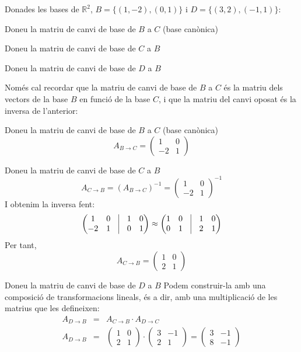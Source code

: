 \Exercise Donades les bases de $\mathbb{R}^2$, $B=\{(1,-2),(0,1)\}$ i $D=\{(3,2),(-1,1)\}$:
\begin{llista}[label=(\alph*)]
  \item Doneu la matriu de canvi de base de $B$ a $C$ (base canònica)
  \item Doneu la matriu de canvi de base de $C$ a $B$
  \item Doneu la matriu de canvi de base de $D$ a $B$
\end{llista}

\Answer Només cal recordar que la matriu de canvi de base de $B$ a $C$ és la matriu dels vectors de la base $B$ en funció de la base $C$, i que la matriu del canvi oposat és la inversa de l'anterior:
\begin{llista}[label=(\alph*)]
  \item Doneu la matriu de canvi de base de $B$ a $C$ (base canònica)
  \[
    A_{B\rightarrow C} = \begin{pmatrix}1&0\\-2&1\end{pmatrix}
  \]
  \blacksquare

  \item Doneu la matriu de canvi de base de $C$ a $B$
  \[
    A_{C\rightarrow B} = (A_{B\rightarrow C})^{-1} =\begin{pmatrix}1&0\\-2&1\end{pmatrix}^{-1}
  \]
  I obtenim la inversa fent:
  \[
    \begin{pmatrix}1&0& \vrule &1&0 \\-2&1& \vrule &0&1\end{pmatrix} \approx
    \begin{pmatrix}1&0& \vrule &1&0 \\0&1& \vrule &2&1\end{pmatrix}
  \]
  Per tant,
  \[
    A_{C\rightarrow B} = \begin{pmatrix}1&0\\2&1\end{pmatrix}
  \]
  \blacksquare

  \item Doneu la matriu de canvi de base de $D$ a $B$
  Podem construir-la amb una composició de transformacions lineals, és a dir, amb una multiplicació de les matrius que les defineixen:
  \begin{eqnarray*}
    A_{D\rightarrow B} &=& A_{C\rightarrow B}\cdot A_{D\rightarrow C}\\
    A_{D\rightarrow B} &=& \begin{pmatrix}1&0\\2&1\end{pmatrix} \cdot
    \begin{pmatrix}3&-1\\2&1\end{pmatrix}=
    \begin{pmatrix}3&-1\\8&-1\end{pmatrix}
  \end{eqnarray*}
  \blacksquare

\end{llista}
